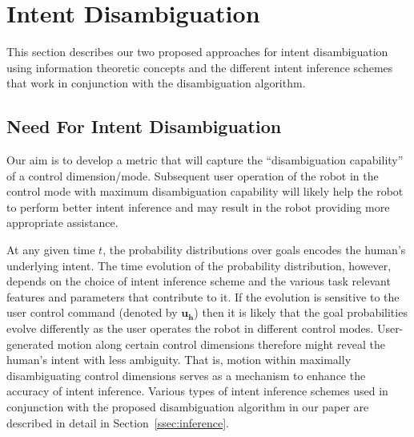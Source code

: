 \documentclass[conference]{IEEEtran}
\begin{document}
\section{Intent Disambiguation}\label{sec:disamb}

This section describes our two proposed approaches for intent disambiguation using information theoretic concepts and the different intent inference schemes that work in conjunction with the disambiguation algorithm. 

\subsection{Need For Intent Disambiguation}

Our aim is to develop a metric that will capture the ``disambiguation capability'' of a control dimension/mode. Subsequent user operation of the robot in the control mode with maximum disambiguation capability will likely help the robot to perform better intent inference and may result in the robot providing more appropriate assistance.

At any given time $t$, the probability distributions over goals encodes the human's underlying intent. The time evolution of the probability distribution, however, depends on the choice of intent inference scheme and the various task relevant features and parameters that contribute to it. If the evolution is sensitive to the user control command (denoted by $\boldsymbol{u_h}$) then it is likely that the goal probabilities evolve differently as the user operates the robot in different control modes. User-generated motion along certain control dimensions therefore might reveal the human's intent with less ambiguity. That is, motion within maximally disambiguating control dimensions serves as a mechanism to enhance the accuracy of intent inference. Various types of intent inference schemes used in conjunction with the proposed disambiguation algorithm in our paper are described in detail in Section~\ref{ssec:inference}. 
\end{document}
